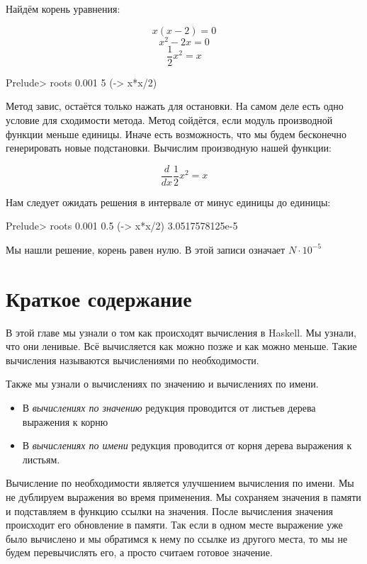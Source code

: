 
Найдём корень уравнения:

\[  x (x-2) = 0 \]
\[  x^2 - 2 x = 0 \]
\[  \frac{1}{2} x^2 = x \]

\begin{code}
Prelude> roots 0.001 5 (\x -> x*x/2)
\end{code}

Метод завис, остаётся только нажать 
для остановки. На самом деле есть одно условие для
сходимости метода. Метод сойдётся, если модуль 
производной функции  меньше единицы. Иначе есть
возможность, что мы будем бесконечно генерировать новые подстановки.
Вычислим производную нашей функции:

\[  \frac{d}{dx} \frac{1}{2} x^2 = x \]

Нам следует ожидать решения в интервале от минус единицы до единицы:

\begin{code}
Prelude> roots 0.001 0.5 (\x -> x*x/2)
3.0517578125e-5
\end{code}

Мы нашли решение, корень равен нулю. В этой записи 
означает $N ^{-5}$

\section{Краткое содержание}

В этой главе мы узнали о том как происходят вычисления
в Haskell. Мы узнали, что они ленивые. Всё вычисляется
как можно позже и как можно меньше. Такие вычисления
называются вычислениями по необходимости.

Также мы узнали о вычислениях по значению и вычислениях по имени.

\begin{itemize}
\item В \emph{вычислениях по значению} редукция проводится от 
        листьев дерева выражения к корню
\item В \emph{вычислениях по имени} редукция проводится от корня 
        дерева выражения к листьям.
\end{itemize}

Вычисление по необходимости является улучшением 
вычисления по имени. Мы не дублируем выражения
во время применения. Мы сохраняем значения в памяти 
и подставляем в функцию ссылки на значения. После вычисления
значения происходит его обновление в памяти. Так если в 
одном месте выражение уже было вычислено и мы обратимся к нему
по ссылке из другого места, то мы не будем перевычислять его,
а просто считаем готовое значение.

